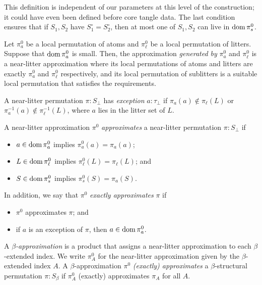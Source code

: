 \documentclass{article}
\begin{document}
\begin{remark}
    This definition is independent of our parameters at this level of the construction; it could have even been defined before core tangle data.
    The last condition ensures that if \( S_1, S_2 \) have \( S_1^\circ = S_2^\circ \), then at most one of \( S_1, S_2 \) can live in \( \operatorname{dom} \pi^0_s \).
\end{remark}
\begin{definition}
    Let \( \pi^0_a \) be a local permutation of atoms and \( \pi^0_\ell \) be a local permutation of litters.
    Suppose that \( \operatorname{dom} \pi^0_a \) is small.
    Then, the approximation \emph{generated by} \( \pi^0_a \) and \( \pi^0_\ell \) is a near-litter approximation where its local permutations of atoms and litters are exactly \( \pi^0_a \) and \( \pi^0_\ell \) respectively, and its local permutation of sublitters is a suitable local permutation that satisfies the requirements.
\end{definition}
\begin{definition}
    A near-litter permutation \( \pi : S_\bot \) has \emph{exception} \( a : \tau_\bot \) if \( \pi_a(a) \not\in \pi_\ell(L) \) or \( \pi^{-1}_a(a) \not\in \pi^{-1}_\ell(L) \), where \( a \) lies in the litter set of \( L \).
\end{definition}
\begin{definition}
    A near-litter approximation \( \pi^0 \) \emph{approximates} a near-litter permutation \( \pi : S_\bot \) if
    \begin{itemize}
        \item \( a \in \operatorname{dom} \pi^0_a \) implies \( \pi^0_a(a) = \pi_a(a) \);
        \item \( L \in \operatorname{dom} \pi^0_\ell \) implies \( \pi^0_\ell(L) = \pi_\ell(L) \); and
        \item \( S \in \operatorname{dom} \pi^0_s \) implies \( \pi^0_s(S) = \pi_a(S) \).
    \end{itemize}
    In addition, we say that \( \pi^0 \) \emph{exactly approximates} \( \pi \) if
    \begin{itemize}
        \item \( \pi^0 \) approximates \( \pi \); and
        \item if \( a \) is an exception of \( \pi \), then \( a \in \operatorname{dom} \pi^0_a \).
    \end{itemize}
\end{definition}
\begin{definition}
    A \emph{\( \beta \)-approximation} is a product that assigns a near-litter approximation to each \( \beta \)-extended index.
    We write \( \pi^0_A \) for the near-litter approximation given by the \( \beta \)-extended index \( A \).
    A \( \beta \)-approximation \( \pi^0 \) \emph{(exactly) approximates} a \( \beta \)-structural permutation \( \pi : S_\beta \) if \( \pi^0_A \) (exactly) approximates \( \pi_A \) for all \( A \).
\end{definition}
\end{document}
